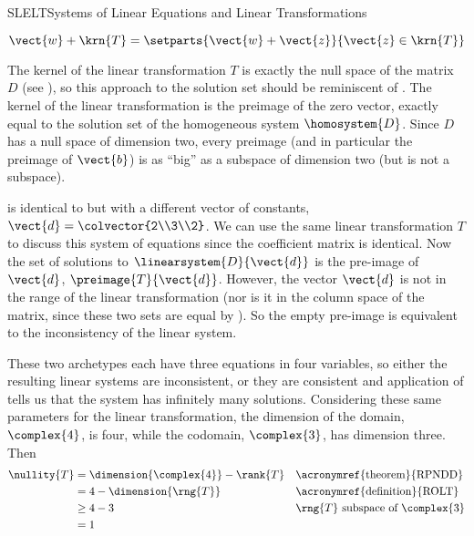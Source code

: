 \begin{subsect}{SLELT}{Systems of Linear Equations and Linear Transformations}
\begin{para}
%
\begin{equation*}
\vect{w}+\krn{T}=\setparts{\vect{w}+\vect{z}}{\vect{z}\in\krn{T}}
\end{equation*}
\end{para}
%
\begin{para}The kernel of the linear transformation $T$ is exactly the null space of the matrix $D$ (see ),  so this approach to the solution set should be reminiscent of .  The kernel of the linear transformation is the preimage of the zero vector, exactly equal to the solution set of the homogeneous system $\homosystem{D}$.  Since $D$ has a null space of dimension two, every preimage (and in particular the preimage of $\vect{b}$) is as ``big'' as a subspace of dimension two (but is not a subspace).\end{para}
%
\begin{para} is identical to  but with a different vector of constants, $\vect{d}=\colvector{2\\3\\2}$.  We can use the same linear transformation $T$ to discuss this system of equations since the coefficient matrix is identical.  Now the set of solutions to $\linearsystem{D}{\vect{d}}$  is the pre-image of $\vect{d}$, $\preimage{T}{\vect{d}}$.  However, the vector $\vect{d}$ is not in the range of the linear transformation (nor is it in the column space of the matrix, since these two sets are equal by ).  So the empty pre-image is equivalent to the inconsistency of the linear system.\end{para}
%
\begin{para}These two archetypes each have three equations in four variables, so either the resulting linear systems are inconsistent, or they are consistent and application of  tells us that the system has infinitely many solutions.  Considering these same parameters for the linear transformation, the dimension of the domain, $\complex{4}$, is four, while the codomain, $\complex{3}$, has dimension three.  Then
%
\begin{align*}
\nullity{T}&=\dimension{\complex{4}}-\rank{T}&&\text{\acronymref{theorem}{RPNDD}}\\
&=4-\dimension{\rng{T}}&&\text{\acronymref{definition}{ROLT}}\\
&\geq 4-3&&\text{$\rng{T}$ subspace of $\complex{3}$}\\
&=1

\end{align*}
\end{para}
\end{subsect}
